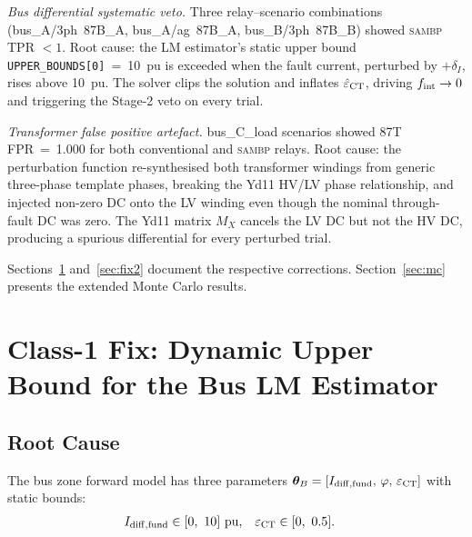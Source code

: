 \documentclass[12pt,a4paper]{article}
\newcommand{\SAMBP}{\textsc{sambp}}
\newcommand{\fint}{f_{\rm int}}
\newcommand{\UB}{\texttt{UPPER\_BOUNDS[0]}}
\begin{document}
\begin{description}[leftmargin=!,labelwidth=\widthof{\textbf{Class~2}}]
  \item[Class~1] \emph{Bus differential systematic veto.}
    Three relay--scenario combinations (bus\_A/3ph~87B\_A,
    bus\_A/ag~87B\_A, bus\_B/3ph~87B\_B) showed \SAMBP{} TPR $< 1$.
    Root cause: the LM estimator's static upper bound \UB{}~=~10~pu is
    exceeded when the fault current, perturbed by $+\delta_I$, rises
    above 10~pu.  The solver clips the solution and inflates
    $\hat{\varepsilon}_{\rm CT}$, driving $\fint \to 0$ and triggering
    the Stage-2 veto on every trial.

  \item[Class~2] \emph{Transformer false positive artefact.}
    bus\_C\_load scenarios showed 87T FPR~=~1.000 for both
    conventional and \SAMBP{} relays.  Root cause: the perturbation
    function re-synthesised both transformer windings from generic
    three-phase template phases, breaking the Yd11
    HV/LV phase relationship, and injected non-zero DC onto the LV
    winding even though the nominal through-fault DC was zero.  The
    Yd11 matrix $M_X$ cancels the LV DC but not the HV DC, producing a
    spurious differential for every perturbed trial.
\end{description}

Sections~\ref{sec:fix1} and~\ref{sec:fix2} document the respective
corrections.  Section~\ref{sec:mc} presents the extended Monte Carlo
results.

\section{Class-1 Fix: Dynamic Upper Bound for the Bus LM Estimator}
\label{sec:fix1}

\subsection{Root Cause}

The bus zone forward model has three parameters
$\boldsymbol{\theta}_B = [I_{\rm diff,fund},\,\varphi,\,\varepsilon_{\rm CT}]$
with static bounds:
\begin{align}
  I_{\rm diff,fund} &\in [0,\ 10]\ \text{pu}, &
  \varepsilon_{\rm CT} &\in [0,\ 0.5].
\end{align}
\end{document}
